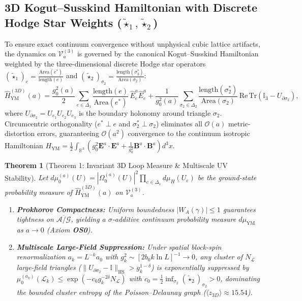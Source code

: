 \documentclass[11pt, a4paper]{article}
\newtheorem{theorem}{Theorem}[section]
\theoremstyle{definition}
\theoremstyle{remark}
\begin{document}
\subsection{3D Kogut--Susskind Hamiltonian with Discrete Hodge Star Weights ($\tilde{\star}_{1}, \tilde{\star}_{2}$)}

To ensure exact continuum convergence without unphysical cubic lattice artifacts, the dynamics on $\mathcal{V}_{a}^{(3)}$ is governed by the canonical Kogut--Susskind Hamiltonian weighted by the three-dimensional discrete Hodge star operators $(\tilde{\star}_{1})_{e} = \frac{\mathrm{Area}(e^{*})}{\mathrm{length}(e)}$ and $(\tilde{\star}_{2})_{\sigma_{2}} = \frac{\mathrm{length}(\sigma_{2}^{*})}{\mathrm{Area}(\sigma_{2})}$:
\begin{equation}
  \hat{H}_{\mathrm{YM}}^{(3D)}(a) = \frac{g_{0}^{2}(a)}{2} \sum_{e \in \Delta_{1}} \frac{\mathrm{length}(e)}{\mathrm{Area}(e^{*})} \, \hat{E}_{e}^{a}\hat{E}_{e}^{a} + \frac{1}{g_{0}^{2}(a)} \sum_{\sigma_{2} \in \Delta_{2}} \frac{\mathrm{length}(\sigma_{2}^{*})}{\mathrm{Area}(\sigma_{2})} \, \mathrm{Re}\,\mathrm{Tr}\!\left(\mathbb{I}_{3} - U_{\partial\sigma_{2}}\right),
\end{equation}
where $U_{\partial\sigma_{2}} = U_{e_{1}}U_{e_{2}}U_{e_{3}}$ is the boundary holonomy around triangle $\sigma_{2}$. Circumcentric orthogonality ($e^{*} \perp e$ and $\sigma_{2}^{*} \perp \sigma_{2}$) eliminates all $\mathcal{O}(a)$ metric-distortion errors, guaranteeing $\mathcal{O}(a^{2})$ convergence to the continuum isotropic Hamiltonian $H_{\mathrm{YM}} = \frac{1}{2}\int_{\mathbb{R}^{3}} \left(g_{0}^{2}\mathbf{E}^{a}\cdot\mathbf{E}^{a} + \frac{1}{g_{0}^{2}}\mathbf{B}^{a}\cdot\mathbf{B}^{a}\right)d^{3}x$.

\begin{theorem}[Theorem 1: Invariant 3D Loop Measure \& Multiscale UV Stability]
\label{thm:theorem1}
Let $d\mu_{0}^{(a)}(U) = |\Omega_{0}^{(a)}(U)|^{2}\prod_{e \in \Delta_{1}} d\mu_{H}(U_{e})$ be the ground-state probability measure of $\hat{H}_{\mathrm{YM}}^{(3D)}(a)$ on $\mathcal{V}_{a}^{(3)}$.
\begin{enumerate}
  \item \textbf{Prokhorov Compactness:} Uniform boundedness $|W_{A}(\gamma)| \le 1$ guarantees tightness on $\overline{\mathcal{A}/\mathcal{G}}$, yielding a $\sigma$-additive continuum probability measure $d\mu_{\mathrm{YM}}$ as $a \to 0$ (Axiom \textbf{OS0}).
  \item \textbf{Multiscale Large-Field Suppression:} Under spatial block-spin renormalization $a_{k} = L^{-k}a_{0}$ with $g_{k}^{2} \sim [2b_{0}k\ln L]^{-1} \to 0$, any cluster of $N_{\mathcal{L}}$ large-field triangles ($\|U_{\partial\sigma_{2}} - \mathbb{I}\|_{\mathrm{HS}} > g_{k}^{1-\delta}$) is exponentially suppressed by $\mu_{0}^{(a_{k})}(\mathcal{L}_{k}) \le \exp(-c_{0}g_{k}^{-2\delta}N_{\mathcal{L}})$ with $c_{0} = \frac{1}{2}\inf_{\sigma_{2}}(\tilde{\star}_{2})_{\sigma_{2}} > 0$, dominating the bounded cluster entropy of the Poisson--Delaunay graph ($\langle z_{3D} \rangle \approx 15.54$).
\end{enumerate}
\end{theorem}
\end{document}
